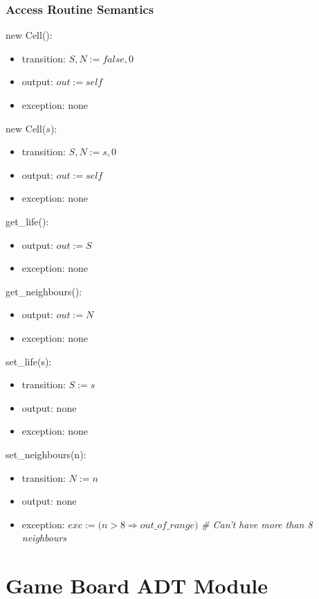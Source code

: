 \documentclass[12pt]{article}
\begin{document}
\subsubsection* {Access Routine Semantics}

new Cell():
\begin{itemize}
    \item transition: $S, N := false, 0$
    \item output: $\mathit{out := self}$
    \item exception: none
\end{itemize}

\noindent
new Cell($s$):
\begin{itemize}
    \item transition: $S, N := s, 0$
    \item output: $\mathit{out := self}$
    \item exception: none
\end{itemize}

\noindent
get\_life():
\begin{itemize}
    \item output: $\mathit{out := S}$
    \item exception: none
\end{itemize}

\noindent
get\_neighbours():
\begin{itemize}
    \item output: $\mathit{out := N}$
    \item exception: none
\end{itemize}

\noindent
set\_life(s):
\begin{itemize}
    \item transition: $\mathit{S := s}$
    \item output: none
    \item exception: none
\end{itemize}

\noindent
set\_neighbours(n):
\begin{itemize}
    \item transition: $\mathit{N := n}$
    \item output: none
    \item exception: $\mathit{exc := (n > 8} \Rightarrow out\_of\_range)$ \textit{\# Can't have more than 8 neighbours}
\end{itemize}

\newpage

\section* {Game Board ADT Module}
\end{document}
